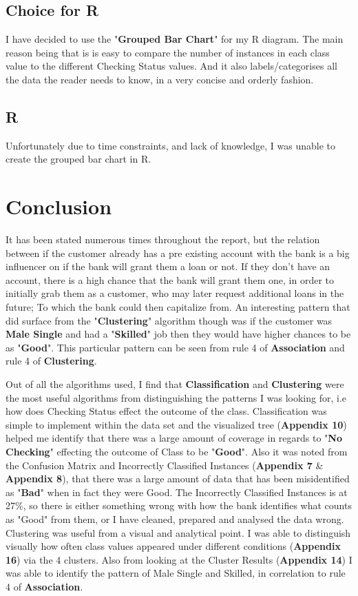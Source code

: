 \documentclass[12pt, a4paper]{article}
\begin{document}
    \subsection{Choice for R}
    I have decided to use the "\textbf{Grouped Bar Chart}" for my R diagram. The main reason being that is is easy to compare the number of instances in each class value to the different Checking Status values. And it also labels/categorises all the data the reader needs to know, in a very concise and orderly fashion.
    
    \subsection{R}
    Unfortunately due to time constraints, and lack of knowledge, I was unable to create the grouped bar chart in R.
    
    \section{Conclusion}
    It has been stated numerous times throughout the report, but the relation between if the customer already has a pre existing account with the bank is a big influencer on if the bank will grant them a loan or not. If they don't have an account, there is a high chance that the bank will grant them one, in order to initially grab them as a customer, who may later request additional loans in the future; To which the bank could then capitalize from. An interesting pattern that did surface from the "\textbf{Clustering}" algorithm though was if the customer was \textbf{Male Single} and had a "\textbf{Skilled}" job then they would have higher chances to be  as "\textbf{Good}". This particular pattern can be seen from rule 4 of \textbf{Association} and rule 4 of \textbf{Clustering}.
    
    Out of all the algorithms used, I find that \textbf{Classification} and \textbf{Clustering} were the most useful algorithms from distinguishing the patterns I was looking for, i.e how does Checking Status effect the outcome of the class. Classification was simple to implement within the data set and the visualized tree (\textbf{Appendix 10}) helped me identify that there was a large amount of coverage in regards to "\textbf{No Checking}" effecting the outcome of Class to be "\textbf{Good}". Also it was noted from the Confusion Matrix and Incorrectly Classified Instances (\textbf{Appendix 7} \& \textbf{Appendix 8}), that there was a large amount of data that has been misidentified as "\textbf{Bad}" when in fact they were Good. The Incorrectly Classified Instances is at 27\%, so there is either something wrong with how the bank identifies what counts as "Good" from them, or I have cleaned, prepared and analysed the data wrong. Clustering was useful from a visual and analytical point. I was able to distinguish visually how often class values appeared under different conditions (\textbf{Appendix 16}) via the 4 clusters. Also from looking at the Cluster Results (\textbf{Appendix 14}) I was able to identify the pattern of Male Single and Skilled, in correlation to rule 4 of \textbf{Association}.
    
\end{document}
